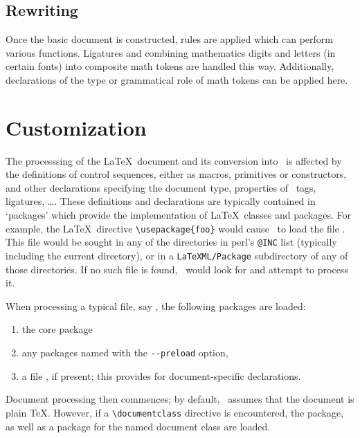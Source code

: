 \documentclass{report}
\begin{document}
\section{Rewriting}\label{architecture.rewriting}
Once the basic document is constructed,  rules are applied which can
perform various functions. Ligatures and combining mathematics digits and letters (in certain fonts)
into composite math tokens are handled this way.  Additionally, declarations
of the type or grammatical role of math tokens can be applied here.


\chapter{Customization}\label{customization}
The processsing of the \LaTeX\ document and its  conversion into \XML\ is affected
by the definitions of control sequences, either as macros, primitives or constructors, 
and other declarations specifying the document type, properties of \XML\ tags, ligatures, \ldots.
These definitions and declarations are typically contained in `packages' which provide
the implementation of \LaTeX\ classes and packages.  For example, the \LaTeX\ directive
\verb|\usepackage{foo}| would cause \LaTeXML\ to load the file .
This file would be sought in any of the directories in perl's \verb|@INC| list (typically
including the current directory), or in a \verb|LaTeXML/Package| subdirectory of any of 
those directories.  If no such file is found, \LaTeXML\ would look for  and
attempt to process it.

When processing a typical file, say , 
the following packages are loaded:
\begin{enumerate}
\item the core  package
\item any packages named with the \verb|--preload| option,
\item a file , if present;
      this provides for document-specific declarations.
\end{enumerate}
Document processing then commences; by default, \LaTeXML\ assumes that the document is plain \TeX.
However, if a \verb|\documentclass| directive is encountered, the  package, as well
as a package for the named document class are loaded.
\end{document}
